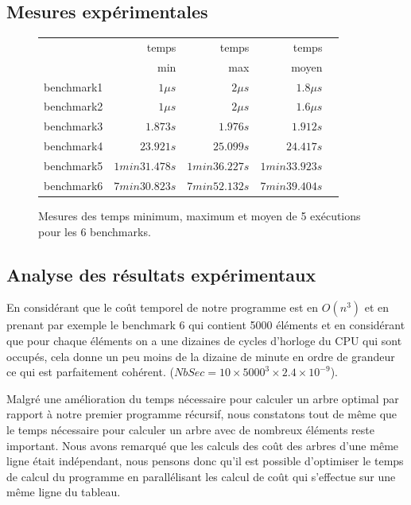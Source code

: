 \documentclass[a4paper, 10pt, french]{article}
\begin{document}
  \subsection{Mesures expérimentales}
    \begin{figure}[h]
      \begin{center}
        \begin{tabular}{|l||r||r|r|r||}
          \hline
          \hline
                        & temps      & temps       & temps \\
                        & min        & max         & moyen \\
          \hline
          \hline
            benchmark1 & $1\mu s$    & $2\mu s$    & $1.8\mu s$  \\
          \hline
            benchmark2 & $1\mu s$    & $2\mu s$    & $1.6\mu s$  \\
          \hline
            benchmark3 & $1.873 s$   & $1.976 s$   & $1.912 s$   \\
          \hline
            benchmark4 & $23.921 s$  & $25.099 s$  & $24.417 s$  \\
          \hline
            benchmark5 &$1min31.478s$&$1min36.227s$&$1min33.923s$\\
          \hline
            benchmark6 &$7min30.823s$&$7min52.132s$&$7min39.404s$\\
          \hline
          \hline
        \end{tabular}
        \caption{Mesures des temps minimum, maximum et moyen de 5 exécutions pour les 6 benchmarks.}
        \label{table-temps}
      \end{center}
    \end{figure}

\subsection{Analyse des résultats expérimentaux}
    En considérant que le coût temporel de notre programme est en $O(n^3)$ et en prenant par exemple le benchmark 6 qui contient 5000 éléments et en considérant que pour chaque éléments on a une dizaines de cycles d'horloge du CPU qui sont occupés, cela donne un peu moins de la dizaine de minute en ordre de grandeur ce qui est parfaitement cohérent. ($NbSec = 10 \times 5000^3 \times 2.4 \times 10^{-9}$).

    Malgré une amélioration du temps nécessaire pour calculer un arbre optimal par rapport à notre premier programme récursif, nous constatons tout de même que le temps nécessaire pour calculer un arbre avec de nombreux éléments reste important. Nous avons remarqué que les calculs des coût des arbres d'une même ligne était indépendant, nous pensons donc qu'il est possible d'optimiser le temps de calcul du programme en parallélisant les calcul de coût qui s'effectue sur une même ligne du tableau.
\end{document}

